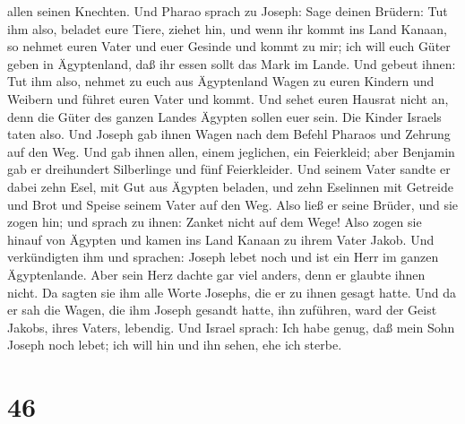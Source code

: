 allen seinen Knechten.  Und Pharao sprach zu Joseph: Sage
deinen Brüdern: Tut ihm also, beladet eure Tiere, ziehet hin,
 und wenn ihr kommt ins Land Kanaan, so nehmet euren Vater
und euer Gesinde und kommt zu mir; ich will euch Güter geben in
Ägyptenland, daß ihr essen sollt das Mark im Lande.  Und
gebeut ihnen: Tut ihm also, nehmet zu euch aus Ägyptenland Wagen zu
euren Kindern und Weibern und führet euren Vater und kommt.
 Und sehet euren Hausrat nicht an, denn die Güter des
ganzen Landes Ägypten sollen euer sein.  Die Kinder Israels
taten also. Und Joseph gab ihnen Wagen nach dem Befehl Pharaos und
Zehrung auf den Weg.  Und gab ihnen allen, einem jeglichen,
ein Feierkleid; aber Benjamin gab er dreihundert Silberlinge und fünf
Feierkleider.  Und seinem Vater sandte er dabei zehn Esel,
mit Gut aus Ägypten beladen, und zehn Eselinnen mit Getreide und Brot
und Speise seinem Vater auf den Weg.  Also ließ er seine
Brüder, und sie zogen hin; und sprach zu ihnen: Zanket nicht auf dem
Wege!  Also zogen sie hinauf von Ägypten und kamen ins Land
Kanaan zu ihrem Vater Jakob.  Und verkündigten ihm und
sprachen: Joseph lebet noch und ist ein Herr im ganzen Ägyptenlande.
Aber sein Herz dachte gar viel anders, denn er glaubte ihnen nicht.
 Da sagten sie ihm alle Worte Josephs, die er zu ihnen
gesagt hatte. Und da er sah die Wagen, die ihm Joseph gesandt hatte, ihn
zuführen, ward der Geist Jakobs, ihres Vaters, lebendig. 
Und Israel sprach: Ich habe genug, daß mein Sohn Joseph noch lebet; ich
will hin und ihn sehen, ehe ich sterbe.

\hypertarget{section-45}{%
\section{46}\label{section-45}}

